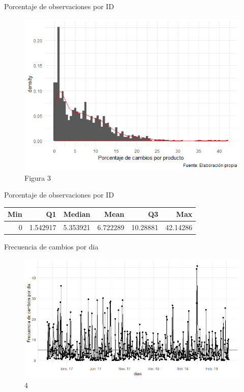\documentclass[xcolor=dvipsnames]{beamer}
\begin{document}
\begin{frame}
Porcentaje de observaciones por ID
\begin{figure}
\includegraphics[scale=0.60]{cambio_producto.png}
\caption{Figura 3}
\end{figure}
\end{frame}


\begin{frame}
Porcentaje de observaciones por ID
\centering
\begin{tabular}{rrrrrr}
\toprule
Min & Q1 & Median & Mean & Q3 & Max\\
\midrule
0 & 1.542917 & 5.353921 & 6.722289 & 10.28881 & 42.14286\\
\bottomrule
\end{tabular}
\end{frame}



\begin{frame}
Frecuencia de cambios por dia
\begin{figure}
\includegraphics[scale=0.60]{frecuencia_dias.png}
\caption{4}
\end{figure}
\end{frame}
\end{document}
